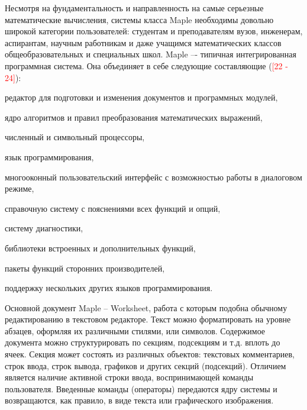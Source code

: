 Несмотря на фундаментальность и направленность на самые серьезные математические вычисления, системы класса Maple необходимы довольно широкой категории пользователей: студентам и преподавателям вузов, инженерам, аспирантам, научным работникам и даже учащимся математических классов общеобразовательных и специальных школ.
Maple –- типичная интегрированная программная система. Она объединяет в себе следующие составляющие (\textcolor{red}{[22 - 24]}):
\begin{textitemize}
	\item редактор для подготовки и изменения документов и программных модулей, 
	\item ядро алгоритмов и правил преобразования математических выражений, 
	\item численный и символьный процессоры, 
	\item язык программирования, 
	\item многооконный пользовательский интерфейс с возможностью работы в диалоговом режиме, 
	\item справочную систему с пояснениями всех функций и опций, 
	\item систему диагностики, 
	\item библиотеки встроенных и дополнительных функций, 
	\item пакеты функций сторонних производителей, 
	\item поддержку нескольких других языков программирования.
\end{textitemize}

Основной документ Maple -- Worksheet, работа с которым подобна обычному редактированию в текстовом редакторе. Текст можно форматировать на уровне абзацев, оформляя их различными стилями, или символов. Содержимое документа можно структурировать по секциям, подсекциям и т.д. вплоть до ячеек. Секция может состоять из различных объектов: текстовых комментариев, строк ввода, строк вывода, графиков и других секций (подсекций). Отличием является наличие активной строки ввода, воспринимающей команды пользователя. Введенные команды (операторы) передаются ядру системы и возвращаются, как правило, в виде текста или графического изображения. 

